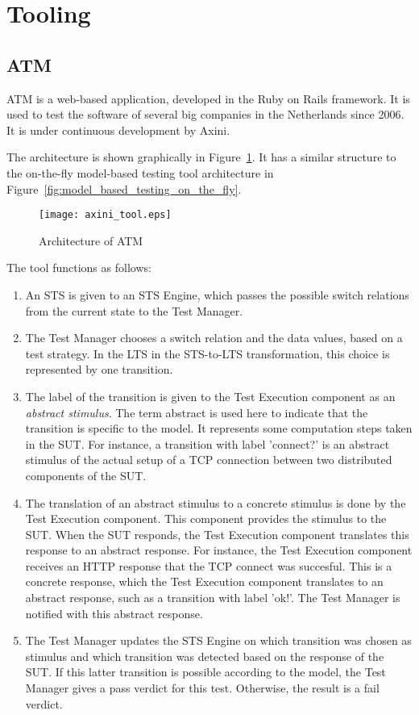 \section{Tooling}\label{sec:tooling}

\subsection{ATM}\label{sec:descriptionaxini}
ATM is a web-based application, developed in the Ruby on Rails framework. It is used to test the software of several big companies in the Netherlands since 2006. It is under continuous development by Axini.

The architecture is shown graphically in Figure~\ref{fig:axini_tool}. It has a similar structure to the on-the-fly model-based testing tool architecture in Figure~\ref{fig:model_based_testing_on_the_fly}.

\begin{figure}[h!]
  \begin{center}
    \texttt{[image: axini\_tool.eps]}
  \end{center}
  \caption{Architecture of ATM}
  \label{fig:axini_tool}
\end{figure}

The tool functions as follows: 
\begin{enumerate}
  \item An STS is given to an STS Engine, which passes the possible switch relations from the current state to the Test Manager.
  \item The Test Manager chooses a switch relation and the data values, based on a test strategy. In the LTS in the STS-to-LTS transformation, this choice is represented by one transition. 
  \item The label of the transition is given to the Test Execution component as an \textit{abstract stimulus}. The term abstract is used here to indicate that the transition is specific to the model. It represents some computation steps taken in the SUT. For instance, a transition with label 'connect?' is an abstract stimulus of the actual setup of a TCP connection between two distributed components of the SUT. 
  \item The translation of an abstract stimulus to a concrete stimulus is done by the Test Execution component. This component provides the stimulus to the SUT. When the SUT responds, the Test Execution component translates this response to an abstract response. For instance, the Test Execution component receives an HTTP response that the TCP connect was succesful. This is a concrete response, which the Test Execution component translates to an abstract response, such as a transition with label 'ok!'. The Test Manager is notified with this abstract response.
  \item The Test Manager updates the STS Engine on which transition was chosen as stimulus and which transition was detected based on the response of the SUT. If this latter transition is possible according to the model, the Test Manager gives a pass verdict for this test. Otherwise, the result is a fail verdict.
\end{enumerate}

